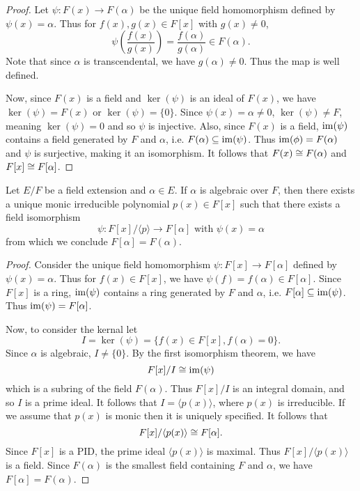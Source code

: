 \documentclass[11pt]{article}
\begin{document}
\begin{proof}
    Let $\psi:F(x)\to F(\alpha)$ be the unique field homomorphism defined by $\psi(x)=\alpha$. Thus for $f(x),g(x)\in F[x]$ with $g(x)\neq0$,
    \[\psi\left(\frac{f(x)}{g(x)}\right)=\frac{f(\alpha)}{g(\alpha)}\in F(\alpha).\]
    Note that since $\alpha$ is transcendental, we have $g(\alpha)\neq0$. Thus the map is well defined.

    Now, since $F(x)$ is a field and $\ker(\psi)$ is an ideal of $F(x)$, we have $\ker(\psi)=F(x)$ or $\ker(\psi)=\{0\}$. Since $\psi(x)=\alpha\neq0$, $\ker(\psi)\neq F$, meaning $\ker(\psi)=0$ and so $\psi$ is injective. Also, since $F(x)$ is a field, $\operatorname{im}(\psi)$ contains a field generated by $F$ and $\alpha$, i.e. $F(\alpha)\subseteq\operatorname{im}(\psi)$. Thus $\operatorname{im}(\phi)=F(\alpha)$ and $\psi$ is surjective, making it an isomorphism. It follows that $F(x)\cong F(\alpha)$ and $F[x]\cong F[\alpha]$.
    
\end{proof}

\begin{theorem}
    Let $E/F$ be a field extension and $\alpha\in E$. If $\alpha$ is algebraic over $F$, then there exists a unique monic irreducible polynomial $p(x)\in F[x]$ such that there exists a field isomorphism
    \[\psi:F[x]/\langle p\rangle\to F[\alpha]\text{ with $\psi(x)=\alpha$}\]
    from which we conclude $F[\alpha]=F(\alpha)$.
\end{theorem}

\begin{proof}
    Consider the unique field homomorphism $\psi:F[x]\to F[\alpha]$ defined by $\psi(x)=\alpha$. Thus for $f(x)\in F[x]$, we have $\psi(f)=f(\alpha)\in F[\alpha]$. Since $F[x]$ is a ring, $\operatorname{im}(\psi)$ contains a ring generated by $F$ and $\alpha$, i.e. $F[\alpha]\subseteq\operatorname{im}(\psi)$. Thus $\operatorname{im}(\psi)=F[\alpha]$.

    Now, to consider the kernal let
    \[I=\ker(\psi)=\{f(x)\in F[x],f(\alpha)=0\}.\]
    Since $\alpha$ is algebraic, $I\neq\{0\}$. By the first isomorphism theorem, we have
    \[F[x]/I\cong\operatorname{im}(\psi)\]
    which is a subring of the field $F(\alpha)$. Thus $F[x]/I$ is an integral domain, and so $I$ is a prime ideal. It follows that $I=\langle p(x)\rangle$, where $p(x)$ is irreducible. If we assume that $p(x)$ is monic then it is uniquely specified. It follows that
    \[F[x]/\langle p(x)\rangle\cong F[\alpha].\]
    Since $F[x]$ is a PID, the prime ideal $\langle p(x)\rangle$ is maximal. Thus $F[x]/\langle p(x)\rangle$ is a field. Since $F(\alpha)$ is the smallest field containing $F$ and $\alpha$, we have $F[\alpha]=F(\alpha)$.
    
\end{proof}
\end{document}

